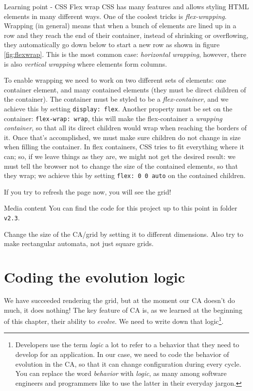 \begin{tips}{Learning point - CSS Flex wrap}
CSS has many features and allows styling HTML elements in many different ways. One of the coolest tricks
is \textit{flex-wrapping}. Wrapping (in general) means that
when a bunch of elements are lined up in a row and they reach the
end of their container, instead of shrinking or overflowing, they automatically go down below to start a
new row as shown in figure \ref{fig:flexwrap}. This is the most common case: \textit{horizontal wrapping},
however, there is also \textit{vertical wrapping} where elements form columns.

To enable wrapping we need to work on two different sets of elements: one container element, and many
contained elements (they must be direct children of the container). The container must be styled to
be a \textit{flex-container}, and we achieve this by setting \texttt{display: flex}. Another property
must be set on the container: \texttt{flex-wrap: wrap}, this will make the flex-container a
\textit{wrapping container}, so that all its direct children would wrap when reaching the borders of it.
Once that's accomplished, we must make sure children do not change in size when filling the container.
In flex containers, CSS tries to fit everything where it can; so, if we leave things as they are, we might
not get the desired result: we must tell the browser not to change the size of the contained elements, so that
they wrap; we achieve this by setting \texttt{flex: 0 0 auto} on the contained children.
\end{tips}

If you try to refresh the page now, you will see the grid!

\begin{trailer}{Media content}
You can find the code for this project up to this point in folder \texttt{v2.3}.
\end{trailer}

\begin{problem}
\label{prob:changecasize}
Change the size of the CA/grid by setting it to different dimensions. Also try to make rectangular
automata, not just square grids.
\end{problem}

\section{Coding the evolution logic}
We have succeeded rendering the grid, but at the moment our CA doesn't do much, it does nothing!
The key feature of CA is, as we learned at the beginning of this chapter, their ability to
\textit{evolve}. We need to write down that
logic\footnote{Developers use the term \textit{logic} a lot to refer to a behavior that they need
to develop for an application. In our case, we need to code the behavior of evolution in the CA,
so that it can change configuration during every cycle. You can replace the word
\textit{behavior} with \textit{logic}, as many among software engineers and programmers like to
use the latter in their everyday jargon.}.

